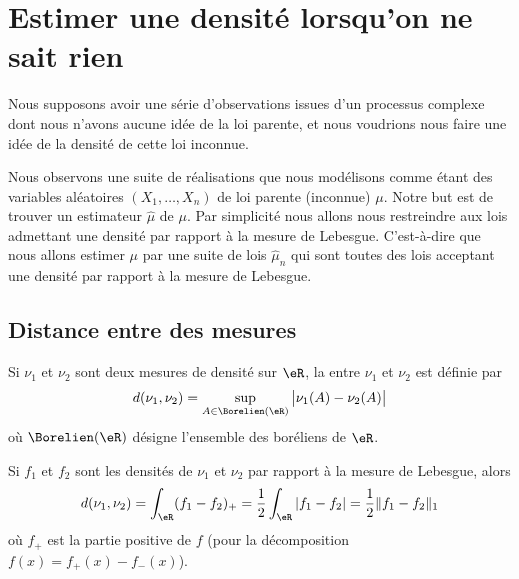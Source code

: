 \section{Estimer une densité lorsqu'on ne sait rien}

Nous supposons avoir une série d'observations issues d'un processus complexe dont nous n'avons aucune idée de la loi parente, et nous voudrions nous faire une idée de la densité de cette loi inconnue.

Nous observons une suite de réalisations que nous modélisons comme étant des variables aléatoires \( (X_1,\ldots, X_n)\) de loi parente (inconnue) \( \mu\). Notre but est de trouver un estimateur \( \hat \mu\) de \( \mu\). Par simplicité nous allons nous restreindre aux lois admettant une densité par rapport à la mesure de Lebesgue. C'est-à-dire que nous allons estimer \( \mu\) par une suite de lois \( \hat \mu_n\) qui sont toutes des lois acceptant une densité par rapport à la mesure de Lebesgue.

\subsection{Distance entre des mesures}

Si \( \nu_1\) et \( \nu_2\) sont deux mesures de densité sur \( \eR\), la  entre \( \nu_1\) et \( \nu_2\) est définie par
\begin{equation}
	d(\nu_1,\nu_2)=\sup_{A\in\Borelien(\eR)}\big| \nu_1(A)-\nu_2(A) \big|
\end{equation}
où \( \Borelien(\eR)\) désigne l'ensemble des boréliens de \( \eR\).

\begin{theorem}
	Si \( f_1\) et \( f_2\) sont les densités de \( \nu_1\) et \( \nu_2\) par rapport à la mesure de Lebesgue, alors
	\begin{equation}
		d(\nu_1,\nu_2)=\int_{\eR}(f_1-f_2)_+=\frac{ 1 }{2}\int_{\eR}| f_1-f_2 |=\frac{ 1 }{2}\| f_1-f_2 \|_1
	\end{equation}
	où \( f_+\) est la partie positive de \( f\) (pour la décomposition \( f(x)=f_+(x)-f_-(x)\)).
\end{theorem}


